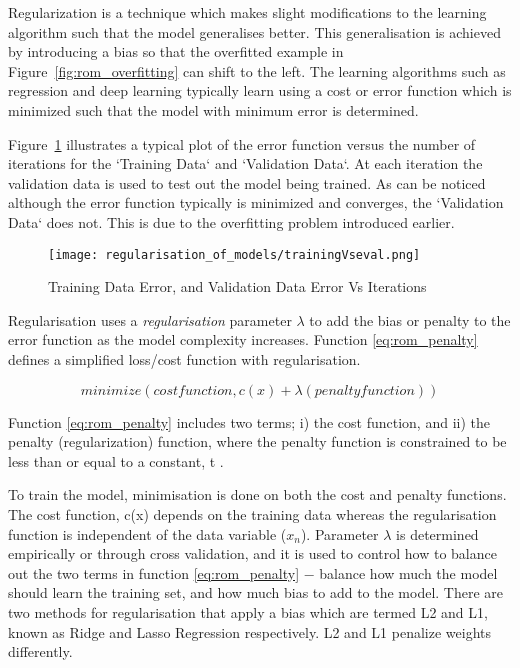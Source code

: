 Regularization is a technique which makes slight modifications to the learning algorithm such that the model generalises better. This generalisation is achieved by introducing a bias  so that the overfitted example in Figure~\ref{fig:rom_overfitting} can shift to the left. The learning algorithms such as regression and deep learning typically learn using a cost or error function which is minimized such that the model with minimum error is determined.

Figure~\ref{fig:rom_traineval} illustrates a typical plot of the error function versus the number of iterations for the `Training Data` and `Validation Data`. At each iteration the validation data is used to test out the model being trained. As can be noticed although the error function typically is minimized and converges, the `Validation Data` does not. This is due to the overfitting problem introduced earlier. 

\begin{figure}
   \texttt{[image: regularisation\_of\_models/trainingVseval.png]}
  \caption{Training Data Error, and Validation Data Error Vs Iterations}
  \label{fig:rom_traineval}
\end{figure}


Regularisation uses a \textit{regularisation} parameter $\lambda$ to add the bias or penalty to the error function as the model complexity increases. Function \ref{eq:rom_penalty}  defines a simplified loss/cost function with regularisation.

\begin{equation}
\label{eq:rom_penalty}
minimize ( cost function, c(x) + \lambda(penalty function) )
\end{equation}

Function  \ref{eq:rom_penalty} includes two terms; i) the cost function, and ii) the penalty (regularization) function, where the penalty function is constrained to be less than or equal to a constant, t \citep{friedman2001elements}.

To train the model, minimisation is done on both the cost and penalty functions. The cost function, c(x) depends on the training data whereas the regularisation function is independent of the data variable ($x_n$). Parameter $\lambda$ is determined empirically or through cross validation, and it is used to control how to balance out the two terms in function \ref{eq:rom_penalty}  $-$ balance how much the model should learn the training set, and how much bias to add to the model. There are two methods for regularisation that apply a bias which are termed L2 and L1, known as Ridge and Lasso Regression respectively. L2 and L1 penalize weights differently.




